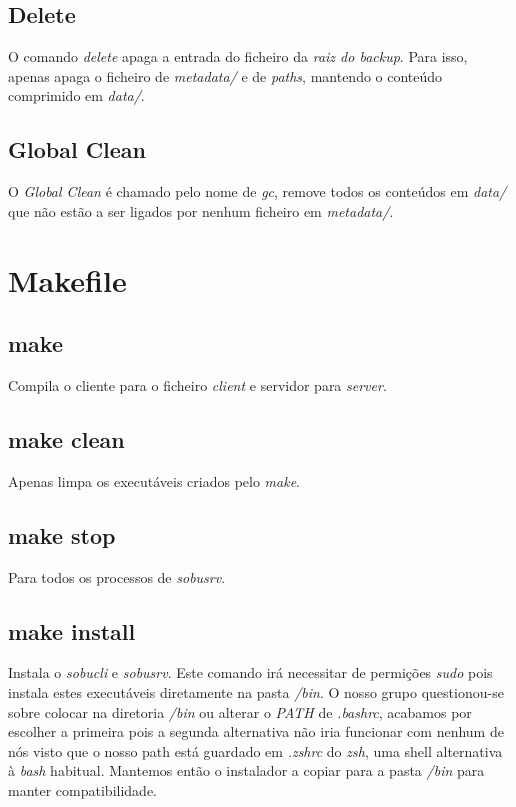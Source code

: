 \documentclass[12pt,a4paper]{report}
\begin{document}
\section{Delete}
O comando \emph{delete} apaga a entrada do ficheiro da \emph{raiz do backup}. Para isso, apenas apaga o ficheiro de \emph{metadata/} e de \emph{paths}, mantendo o conteúdo comprimido em \emph{data/}.

\section{Global Clean}
O \emph{Global Clean} é chamado pelo nome de \emph{gc}, remove todos os conteúdos em \emph{data/} que não estão a ser ligados por nenhum ficheiro em \emph{metadata/}.

\chapter{Makefile}
\section{make}
Compila o cliente para o ficheiro \emph{client} e servidor para \emph{server}.

\section{make clean}
Apenas limpa os executáveis criados pelo \emph{make}.

\section{make stop}
Para todos os processos de \emph{sobusrv}.

\section{make install}
Instala o \emph{sobucli} e \emph{sobusrv}. Este comando irá necessitar de permições \emph{sudo} pois instala estes executáveis diretamente na pasta \emph{/bin}. O nosso grupo questionou-se sobre colocar na diretoria \emph{/bin} ou alterar o \emph{PATH} de \emph{.bashrc}, acabamos por escolher a primeira pois a segunda alternativa não iria funcionar com nenhum de nós visto que o nosso path está guardado em \emph{.zshrc} do \emph{zsh}, uma shell alternativa à \emph{bash} habitual. Mantemos então o instalador a copiar para a pasta \emph{/bin} para manter compatibilidade.
\end{document}
